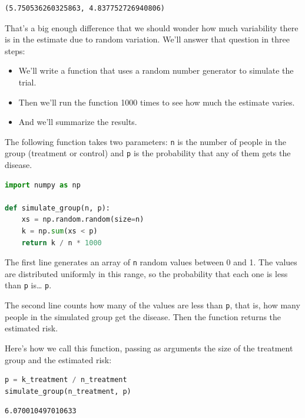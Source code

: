 \begin{lstlisting}[style=output]
(5.750536260325863, 4.837752726940806)
\end{lstlisting}

That's a big enough difference that we should wonder how much
variability there is in the estimate due to random variation. We'll
answer that question in three steps:

\begin{itemize}
\item
  We'll write a function that uses a random number generator to simulate
  the trial.
\item
  Then we'll run the function 1000 times to see how much the estimate
  varies.
\item
  And we'll summarize the results.
\end{itemize}

The following function takes two parameters: \passthrough{\lstinline!n!}
is the number of people in the group (treatment or control) and
\passthrough{\lstinline!p!} is the probability that any of them gets the
disease.

\begin{lstlisting}[language=Python,style=source]
import numpy as np

def simulate_group(n, p):
    xs = np.random.random(size=n)
    k = np.sum(xs < p)
    return k / n * 1000
\end{lstlisting}

The first line generates an array of \passthrough{\lstinline!n!} random
values between 0 and 1. The values are distributed uniformly in this
range, so the probability that each one is less than
\passthrough{\lstinline!p!} is\ldots{} \passthrough{\lstinline!p!}.

The second line counts how many of the values are less than
\passthrough{\lstinline!p!}, that is, how many people in the simulated
group get the disease. Then the function returns the estimated risk.

Here's how we call this function, passing as arguments the size of the
treatment group and the estimated risk:

\begin{lstlisting}[language=Python,style=source]
p = k_treatment / n_treatment
simulate_group(n_treatment, p)
\end{lstlisting}

\begin{lstlisting}[style=output]
6.070010497010633
\end{lstlisting}

